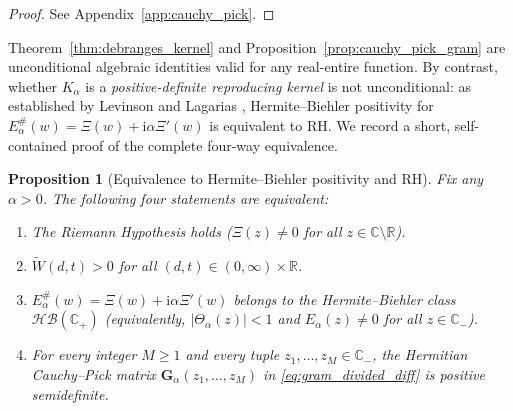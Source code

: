 \documentclass[11pt,reqno]{amsart}
\newtheorem{proposition}[theorem]{Proposition}
\theoremstyle{definition}
\theoremstyle{remark}
\numberwithin{equation}{section}
\newcommand{\ii}{\mathrm{i}}
\begin{document}
\begin{proof}
See Appendix~\ref{app:cauchy_pick}.
\end{proof}

Theorem~\ref{thm:debranges_kernel} and Proposition~\ref{prop:cauchy_pick_gram} are unconditional algebraic identities valid for any real-entire function. By contrast, whether $K_\alpha$ is a \emph{positive-definite reproducing kernel} is not unconditional: as established by Levinson \cite{Levinson1974} and Lagarias \cite{Lagarias2005,Lagarias2006}, Hermite--Biehler positivity for $E_\alpha^\#(w) = \Xi(w) + \ii\alpha\Xi'(w)$ is equivalent to RH. We record a short, self-contained proof of the complete four-way equivalence.

\begin{proposition}[Equivalence to Hermite--Biehler positivity and RH]\label{prop:hb_rh_equivalence}
Fix any $\alpha > 0$. The following four statements are equivalent:
\begin{enumerate}[label=\textup{(\roman*)},leftmargin=2.2em]
  \item The Riemann Hypothesis holds ($\Xi(z) \neq 0$ for all $z \in \mathbb{C}\setminus\mathbb{R}$).
  \item $\widetilde{W}(d,t) > 0$ for all $(d,t) \in (0,\infty) \times \mathbb{R}$.
  \item $E_\alpha^\#(w) = \Xi(w) + \ii\alpha\Xi'(w)$ belongs to the Hermite--Biehler class $\mathcal{HB}(\mathbb{C}_+)$ (equivalently, $\lvert\Theta_\alpha(z)\rvert < 1$ and $E_\alpha(z) \neq 0$ for all $z \in \mathbb{C}_-$).
  \item For every integer $M \ge 1$ and every tuple $z_1,\dots,z_M \in \mathbb{C}_-$, the Hermitian Cauchy--Pick matrix $\mathbf{G}_\alpha(z_1,\dots,z_M)$ in \eqref{eq:gram_divided_diff} is positive semidefinite.
\end{enumerate}
\end{proposition}
\end{document}

